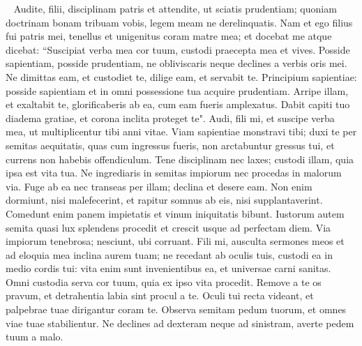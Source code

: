 \begin{biblechapter}   
\verse Audite, filii, disciplinam patris et attendite, ut sciatis prudentiam; 
\verse quoniam doctrinam bonam tribuam vobis, legem meam ne derelinquatis. 
\verse Nam et ego filius fui patris mei, tenellus et unigenitus coram matre mea; 
\verse et docebat me atque dicebat: “Suscipiat verba mea cor tuum, custodi praecepta mea et vives. 
\verse Posside sapientiam, posside prudentiam, ne obliviscaris neque declines a verbis oris mei. 
\verse Ne dimittas eam, et custodiet te, dilige eam, et servabit te. 
\verse Principium sapientiae: posside sapientiam et in omni possessione tua acquire prudentiam. 
\verse Arripe illam, et exaltabit te, glorificaberis ab ea, cum eam fueris amplexatus. 
\verse Dabit capiti tuo diadema gratiae, et corona inclita proteget te". 
\verse Audi, fili mi, et suscipe verba mea, ut multiplicentur tibi anni vitae. 
\verse Viam sapientiae monstravi tibi; duxi te per semitas aequitatis, 
\verse quas cum ingressus fueris, non arctabuntur gressus tui, et currens non habebis offendiculum. 
\verse Tene disciplinam nec laxes; custodi illam, quia ipsa est vita tua. 
\verse Ne ingrediaris in semitas impiorum nec procedas in malorum via. 
\verse Fuge ab ea nec transeas per illam; declina et desere eam. 
\verse Non enim dormiunt, nisi malefecerint, et rapitur somnus ab eis, nisi supplantaverint. 
\verse Comedunt enim panem impietatis et vinum iniquitatis bibunt. 
\verse Iustorum autem semita quasi lux splendens procedit et crescit usque ad perfectam diem. 
\verse Via impiorum tenebrosa; nesciunt, ubi corruant. 
\verse Fili mi, ausculta sermones meos et ad eloquia mea inclina aurem tuam; 
\verse ne recedant ab oculis tuis, custodi ea in medio cordis tui: 
\verse vita enim sunt invenientibus ea, et universae carni sanitas. 
\verse Omni custodia serva cor tuum, quia ex ipso vita procedit. 
\verse Remove a te os pravum, et detrahentia labia sint procul a te. 
\verse Oculi tui recta videant, et palpebrae tuae dirigantur coram te. 
\verse Observa semitam pedum tuorum, et omnes viae tuae stabilientur. 
\verse Ne declines ad dexteram neque ad sinistram, averte pedem tuum a malo. 
\end{biblechapter}

